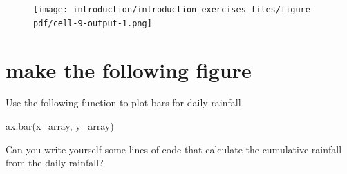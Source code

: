 \documentclass[
  letterpaper,
  DIV=11,
  numbers=noendperiod]{scrreprt}
\newenvironment{Shaded}{\begin{snugshade}}{\end{snugshade}}
\newcommand{\NormalTok}[1]{\textcolor[rgb]{0.00,0.23,0.31}{#1}}
\begin{document}
\begin{figure}[H]

{\centering \texttt{[image: introduction/introduction-exercises\_files/figure-pdf/cell-9-output-1.png]}

}

\end{figure}

\hypertarget{make-the-following-figure}{%
\section{make the following figure}\label{make-the-following-figure}}

Use the following function to plot bars for daily rainfall

\begin{Shaded}
\begin{Highlighting}[]
\NormalTok{ax.bar(x\_array, y\_array)}
\end{Highlighting}
\end{Shaded}

Can you write yourself some lines of code that calculate the cumulative
rainfall from the daily rainfall?
\end{document}
